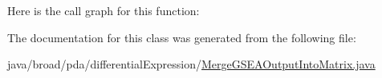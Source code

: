 Here is the call graph for this function\+:




The documentation for this class was generated from the following file\+:\begin{DoxyCompactItemize}
\item 
java/broad/pda/differential\+Expression/\hyperlink{_merge_g_s_e_a_output_into_matrix_8java}{Merge\+G\+S\+E\+A\+Output\+Into\+Matrix.\+java}\end{DoxyCompactItemize}
